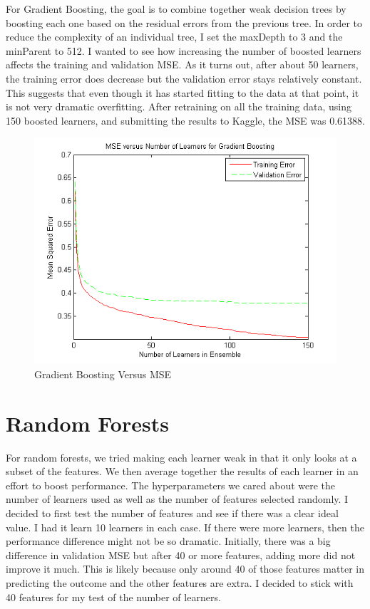 \documentclass[twoside,11pt]{article}
\theoremstyle{definition}
\begin{document}
For Gradient Boosting, the goal is to combine together weak decision trees by boosting each one based on the residual errors from the previous tree. In order to reduce the complexity of an individual tree, I set the maxDepth to 3 and the minParent to 512. I wanted to see how increasing the number of boosted learners affects the training and validation MSE. As it turns out, after about 50 learners, the training error does decrease but the validation error stays relatively constant. This suggests that even though it has started fitting to the data at that point, it is not very dramatic overfitting. After retraining on all the training data, using 150 boosted learners, and submitting the results to Kaggle, the MSE was 0.61388. \\
\begin{figure}[h!]
\centering
\includegraphics[width=4 in]{numGradBoostsVersusMSE.png}
\caption{Gradient Boosting Versus MSE}
\end{figure}

\newpage

\section*{Random Forests}

For random forests, we tried making each learner weak in that it only looks at a subset of the features. We then average together the results of each learner in an effort to boost performance. The hyperparameters we cared about were the number of learners used as well as the number of features selected randomly. I decided to first test the number of features and see if there was a clear ideal value. I had it learn 10 learners in each case. If there were more learners, then the performance difference might not be so dramatic. Initially, there was a big difference in validation MSE but after 40 or more features, adding more did not improve it much. This is likely because only around 40 of those features matter in predicting the outcome and the other features are extra. I decided to stick with 40 features for my test of the number of learners. \\
\end{document}
